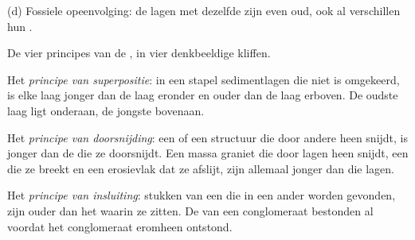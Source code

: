 \begin{omfigure}
\begin{minipage}[t]{0.49\linewidth}
{\small (d) Fossiele opeenvolging: de lagen met dezelfde  zijn
even oud, ook al verschillen hun .}
\end{minipage}

\medskip
{\small De vier principes van de , in vier denkbeeldige
kliffen.}
\label{fig:g7:geological-time:principles}
\end{omfigure}

\begin{definition}\label{def:g7:geological-time:superposition}
Het \emph{principe van superpositie}: in
een stapel sedimentlagen die niet is omgekeerd, is elke laag jonger dan de
laag eronder en ouder dan de laag erboven. De oudste laag ligt onderaan,
de jongste bovenaan.
\end{definition}

\begin{definition}\label{def:g7:geological-time:cross-cutting}
Het \emph{principe van doorsnijding}: een
 of een structuur die door andere  heen snijdt, is
jonger dan de  die ze doorsnijdt. Een massa graniet die door
lagen heen snijdt, een  die ze breekt en een erosievlak dat ze
afslijt, zijn allemaal jonger dan die lagen.
\end{definition}

\begin{definition}\label{def:g7:geological-time:inclusion}
Het \emph{principe van insluiting}: stukken
van een  die in een ander  worden gevonden, zijn ouder
dan het  waarin ze zitten. De  van een conglomeraat
bestonden al voordat het conglomeraat eromheen ontstond.
\end{definition}

